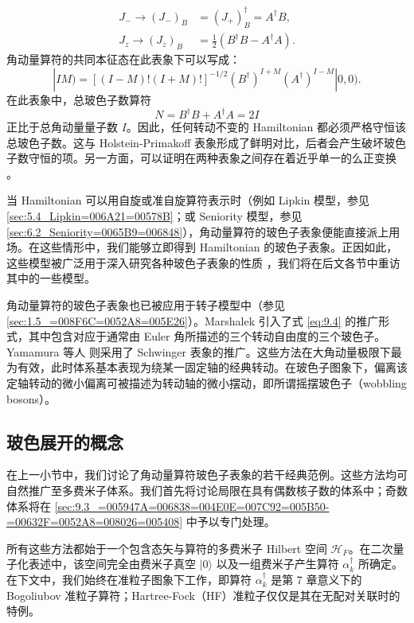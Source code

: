 \begin{enumerate}
\begin{align}
J_{-}\to(J_{-})_{B} & =(J_{+})^{\dagger}_{B}=A^{\dagger}B,\label{eq:9.12}\\
J_{z}\to(J_{z})_{B} & =\frac{1}{2}(B^{\dagger}B-A^{\dagger}A).\nonumber 
\end{align}
角动量算符的共同本征态在此表象下可以写成：
\begin{equation}
|IM)=\left[(I-M)!(I+M)!\right]^{-1/2}(B^{\dagger})^{I+M}(A^{\dagger})^{I-M}|0,0).\label{eq:9.13}
\end{equation}
在此表象中，总玻色子数算符
\begin{equation}
N=B^{\dagger}B+A^{\dagger}A=2I\label{eq:9.14}
\end{equation}
正比于总角动量量子数 $I$。因此，任何转动不变的 Hamiltonian 都必须严格守恒该总玻色子数。这与 Holstein-Primakoff
表象形成了鲜明对比，后者会产生破坏玻色子数守恒的项。另一方面，可以证明在两种表象之间存在着近乎单一的么正变换 \cite{BM78}。
\end{enumerate}
当 Hamiltonian 可以用自旋或准自旋算符表示时（例如 Lipkin 模型，参见 \ref{sec:5.4_Lipkin=006A21=00578B}；或
Seniority 模型，参见 \ref{sec:6.2_Seniority=0065B9=006848}），角动量算符的玻色子表象便能直接派上用场。在这些情形中，我们能够立即得到
Hamiltonian 的玻色子表象。正因如此，这些模型被广泛用于深入研究各种玻色子表象的性质 \cite{PKD68,BS68b,KI69}，我们将在后文各节中重访其中的一些模型。

角动量算符的玻色子表象也已被应用于转子模型中（参见 \ref{sec:1.5_=008F6C=0052A8=005E26}）。Marshalek
\cite{Ma75b} 引入了式 \ref{eq:9.4} 的推广形式，其中包含对应于通常由 Euler 角所描述的三个转动自由度的三个玻色子。Yamamura
等人 \cite{YSI78,IY78} 则采用了 Schwinger 表象的推广。这些方法在大角动量极限下最为有效，此时体系基本表现为绕某一固定轴的经典转动。在玻色子图象下，偏离该定轴转动的微小偏离可被描述为转动轴的微小摆动，即所谓摇摆玻色子（wobbling
bosons）\cite{BM75,Ma79}。

\subsection{玻色展开的概念\label{subsec:9.2.2_=0073BB=008272=005C55=005F00=007684=006982=005FF5}}

在上一小节中，我们讨论了角动量算符玻色子表象的若干经典范例。这些方法均可自然推广至多费米子体系。我们首先将讨论局限在具有偶数核子数的体系中；奇数体系将在
\ref{sec:9.3_=005947A=006838=004E0E=007C92=005B50-=00632F=0052A8=008026=005408}
中予以专门处理。

所有这些方法都始于一个包含态矢与算符的多费米子 Hilbert 空间 $\mathcal{H}_{F}$。在二次量子化表述中，该空间完全由费米子真空
$|0\rangle$ 以及一组费米子产生算符 $\alpha^{\dagger}_{k}$ 所确定。在下文中，我们始终在准粒子图象下工作，即算符
$\alpha^{\dagger}_{k}$ 是第 7 章意义下的 Bogoliubov 准粒子算符；Hartree-Fock（HF）准粒子仅仅是其在无配对关联时的特例。

